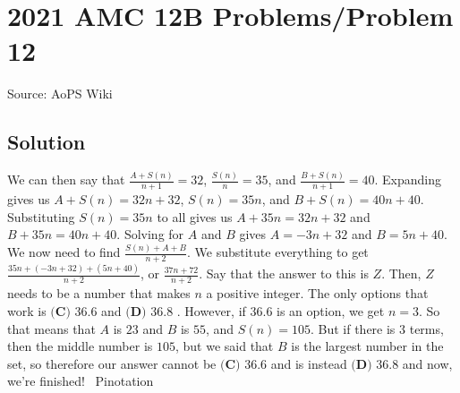 \documentclass[12pt]{article}
\begin{document}
\section*{{2021 AMC 12B Problems/Problem 12}}
Source: AoPS Wiki

\subsection*{Solution}
We can then say that \( \frac{A+S(n)}{n+1} = 32 \), \( \frac{S(n)}{n} = 35 \), and \( \frac{B+S(n)}{n+1} = 40 \). Expanding gives us \( A+S(n) = 32n+32 \), \( S(n) = 35n \), and \( B+S(n) = 40n+40 \). Substituting \( S(n) = 35n \) to all gives us \( A+35n=32n+32 \) and \( B+35n=40n+40 \). Solving for \( A \) and \( B \) gives \( A=-3n+32 \) and \( B = 5n+40 \). We now need to find \( \frac{S(n)+A+B}{n+2} \). We substitute everything to get \( \frac{35n+(-3n+32)+(5n+40)}{n+2} \), or \( \frac{37n+72}{n+2} \). Say that the answer to this is \( Z \). Then, \( Z \) needs to be a number that makes \( n \) a positive integer. The only options that work is $\boxed{\textbf{(C) }36.6}$ and $\boxed{\textbf{(D) }36.8}$ . However, if 36.6 is an option, we get \( n=3 \). So that means that \(A\) is \(23\) and \(B\) is \(55\), and \( S(n)=105 \). But if there is \(3\) terms, then the middle number is \(105\), but we said that \( B \) is the largest number in the set, so therefore our answer cannot be $\boxed{\textbf{(C) }36.6}$ and is instead $\boxed{\textbf{(D) }36.8}$ and now, we're finished! ~Pinotation
\end{document}
